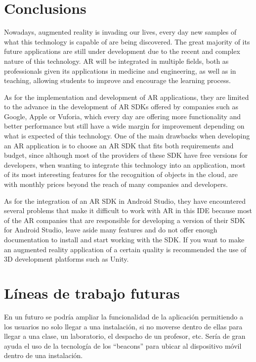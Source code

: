 \section{Conclusions}

Nowadays, augmented reality is invading our lives, every day new samples of what this technology is capable of are being discovered. The great majority of its future applications are still under development due to the recent and complex nature of this technology. AR will be integrated in multiple fields, both as professionals given its applications in medicine and engineering, as well as in teaching, allowing students to improve and encourage the learning process. 

As for the implementation and development of AR applications, they are limited to the advance in the development of AR SDKs offered by companies such as Google, Apple or Vuforia, which every day are offering more functionality and better performance but still have a wide margin for improvement depending on what is expected of this technology. One of the main drawbacks when developing an AR application is to choose an AR SDK that fits both requirements and budget, since although most of the providers of these SDK have free versions for developers, when wanting to integrate this technology into an application, most of its most interesting features for the recognition of objects in the cloud, are with monthly prices beyond the reach of many companies and developers.

As for the integration of an AR SDK in Android Studio, they have encountered several problems that make it difficult to work with AR in this IDE because most of the AR companies that are responsible for developing a version of their SDK for Android Studio, leave aside many features and do not offer enough documentation to install and start working with the SDK. If you want to make an augmented reality application of a certain quality is recommended the use of 3D development platforms such as Unity.

\section{Líneas de trabajo futuras}

En un futuro se podría ampliar la funcionalidad de la aplicación permitiendo a los usuarios no solo llegar a una instalación, si no moverse dentro de ellas para llegar a una clase, un laboratorio, el despacho de un profesor, etc. Sería de gran ayuda el uso de la tecnología de los ``beacons'' \cite{URL::beacon} para ubicar al dispositivo móvil dentro de una instalación.

